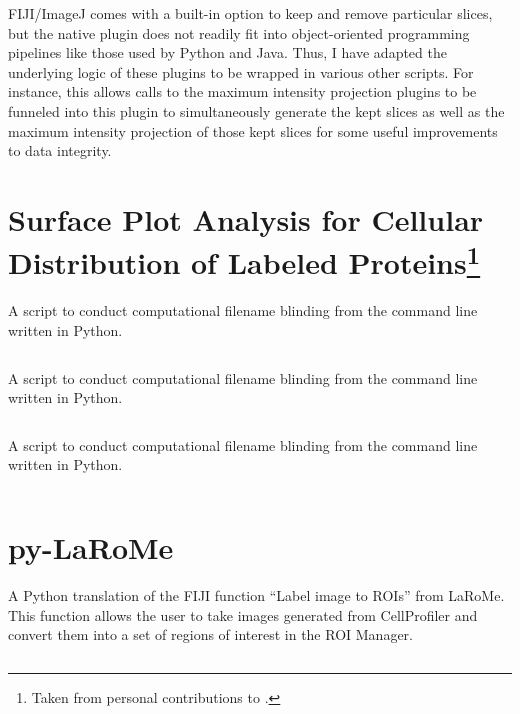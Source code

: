 FIJI/ImageJ comes with a built-in option to keep and remove particular slices, but the native plugin does not readily fit into object-oriented programming pipelines like those used by Python and Java. Thus, I have adapted the underlying logic of these plugins to be wrapped in various other scripts. For instance, this allows calls to the maximum intensity projection plugins to be funneled into this plugin to simultaneously generate the kept slices as well as the maximum intensity projection of those kept slices for some useful improvements to data integrity. 

\section[Surface Plot Analysis for Cellular Distribution of Labeled Proteins]{Surface Plot Analysis for Cellular Distribution of Labeled Proteins\footnote{Taken from personal contributions to \citet{Saelens2022}.}}

\begin{code}
\caption{A script to conduct computational filename blinding from the command line written in Python.}
\label{blinder}

\inputminted[breaklines,frame=single]{python}{source/renamer.py}

\end{code}

\begin{code}
\caption{A script to conduct computational filename blinding from the command line written in Python.}
\label{blinder}

\inputminted[breaklines,frame=single]{python}{source/renamer.py}

\end{code}

\begin{code}
\caption{A script to conduct computational filename blinding from the command line written in Python.}
\label{blinder}

\inputminted[breaklines,frame=single]{python}{source/renamer.py}

\end{code}


\section{py-LaRoMe}\label{larome}

\begin{code}
\caption{A Python translation of the FIJI function ``Label image to ROIs'' from LaRoMe. This function allows the user to take images generated from CellProfiler and convert them into a set of regions of interest in the ROI Manager.}
\label{l2r}

\inputminted[breaklines,frame=single]{python}{source/labelsToROIs.py}

\end{code}

